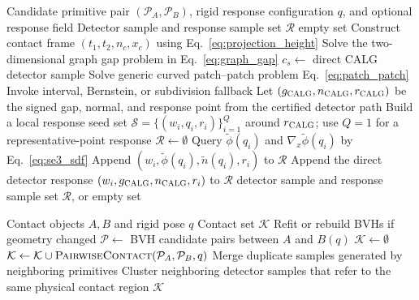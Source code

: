 \documentclass[preprint,12pt]{elsarticle}
\newcommand{\Pc}{\mathcal{P}}
\newcommand{\calg}{\textsc{CALG}}
\begin{document}
\begin{algorithm}[t]
\caption{Pairwise contact query and configuration-space SDF refinement}
\label{alg:pair_query}
\begin{algorithmic}[1]
\Require Candidate primitive pair $(\Pc_A,\Pc_B)$, rigid response configuration $q$, and optional response field
\Ensure Detector sample and response sample set $\mathcal R$
    \State \Return empty set
\EndIf
\State Construct contact frame $(t_1,t_2,n_c,x_c)$ using Eq.~\eqref{eq:projection_height}
    \State Solve the two-dimensional graph gap problem in Eq.~\eqref{eq:graph_gap}
        \State $c_s\gets$ direct \calg{} detector sample
    \EndIf
\EndIf
{}
    \State Solve generic curved patch--patch problem Eq.~\eqref{eq:patch_patch}
        \State Invoke interval, Bernstein, or subdivision fallback
    \EndIf
\EndIf
\State Let $(g_{\calg},n_{\calg},r_{\calg})$ be the signed gap, normal, and response point from the certified detector path
\State Build a local response seed set $\mathcal S=\{(w_i,q_i,r_i)\}_{i=1}^{Q}$ around $r_{\calg}$; use $Q=1$ for a representative-point response
\State $\mathcal R\gets\emptyset$
        \State Query $\tilde\phi(q_i)$ and $\nabla_x\tilde\phi(q_i)$ by Eq.~\eqref{eq:se3_sdf}
        \State Append $(w_i,\tilde\phi(q_i),\tilde n(q_i),r_i)$ to $\mathcal R$
    \Else
        \State Append the direct detector response $(w_i,g_{\calg},n_{\calg},r_i)$ to $\mathcal R$
    \EndIf
\EndFor
\State \Return detector sample and response sample set $\mathcal R$, or empty set
\end{algorithmic}
\end{algorithm}

\begin{algorithm}[t]
\caption{Global contact detection}
\label{alg:global}
\begin{algorithmic}[1]
\Require Contact objects $A,B$ and rigid pose $q$
\Ensure Contact set $\mathcal{K}$
\State Refit or rebuild BVHs if geometry changed
\State $\mathcal{P}\gets$ BVH candidate pairs between $A$ and $B(q)$
\State $\mathcal{K}\gets\emptyset$
\For{each $(\Pc_A,\Pc_B)\in\mathcal{P}$}
    \State $\mathcal{K}\gets \mathcal{K}\cup \textsc{PairwiseContact}(\Pc_A,\Pc_B,q)$
\EndFor
\State Merge duplicate samples generated by neighboring primitives
\State Cluster neighboring detector samples that refer to the same physical contact region
\State \Return $\mathcal{K}$
\end{algorithmic}
\end{algorithm}
\end{document}
